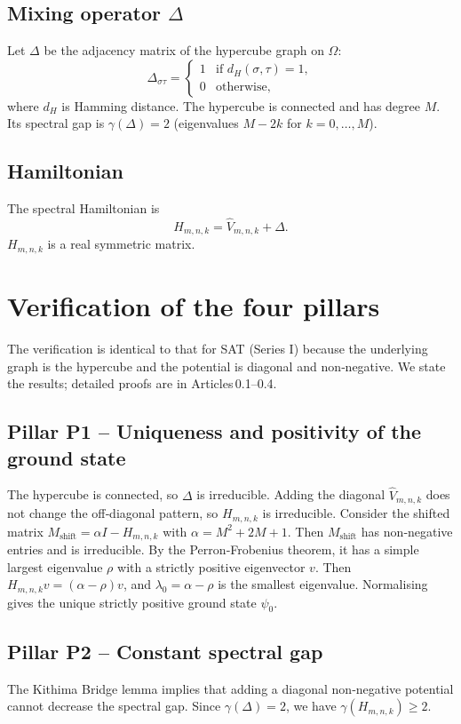 \documentclass[11pt,a4paper]{article}
\begin{document}
\subsection{Mixing operator \(\Delta\)}
Let \(\Delta\) be the adjacency matrix of the hypercube graph on \(\Omega\):
\[
\Delta_{\sigma\tau} = \begin{cases}
1 & \text{if } d_H(\sigma,\tau)=1,\\
0 & \text{otherwise},
\end{cases}
\]
where \(d_H\) is Hamming distance. The hypercube is connected and has degree \(M\). Its spectral gap is \(\gamma(\Delta)=2\) (eigenvalues \(M-2k\) for \(k=0,\dots,M\)).

\subsection{Hamiltonian}
The spectral Hamiltonian is
\[
H_{m,n,k} = \hat{V}_{m,n,k} + \Delta.
\]
\(H_{m,n,k}\) is a real symmetric matrix.

\section{Verification of the four pillars}

The verification is identical to that for SAT (Series I) because the underlying graph is the hypercube and the potential is diagonal and non‑negative. We state the results; detailed proofs are in Articles 0.1–0.4.

\subsection{Pillar P1 – Uniqueness and positivity of the ground state}
The hypercube is connected, so \(\Delta\) is irreducible. Adding the diagonal \(\hat{V}_{m,n,k}\) does not change the off‑diagonal pattern, so \(H_{m,n,k}\) is irreducible. Consider the shifted matrix \(M_{\text{shift}} = \alpha I - H_{m,n,k}\) with \(\alpha = M^2 + 2M + 1\). Then \(M_{\text{shift}}\) has non‑negative entries and is irreducible. By the Perron‑Frobenius theorem, it has a simple largest eigenvalue \(\rho\) with a strictly positive eigenvector \(v\). Then \(H_{m,n,k} v = (\alpha-\rho)v\), and \(\lambda_0 = \alpha-\rho\) is the smallest eigenvalue. Normalising gives the unique strictly positive ground state \(\psi_0\).

\subsection{Pillar P2 – Constant spectral gap}
The Kithima Bridge lemma implies that adding a diagonal non‑negative potential cannot decrease the spectral gap. Since \(\gamma(\Delta)=2\), we have \(\gamma(H_{m,n,k}) \ge 2\).
\end{document}
